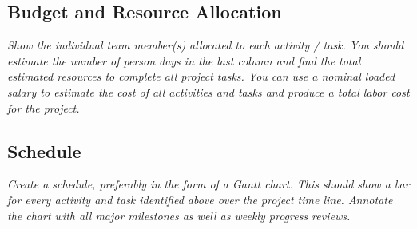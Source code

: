 \documentclass[11pt]{article}
\begin{document}
\subsection{Budget and Resource Allocation}
{\it Show the individual team member(s) allocated to each activity / task.  You should estimate the
number of person days in the last column and find the total estimated resources to complete all
project tasks.  You can use a nominal loaded salary to estimate the cost of all activities and tasks
and produce a total labor cost for the project.}
\subsection{Schedule}
{\it Create a schedule, preferably in the form of a Gantt chart.  This should show a bar for every
activity and task identified above over the project time line.  Annotate the chart with all major
milestones as well as weekly progress reviews.}


\end{document}
